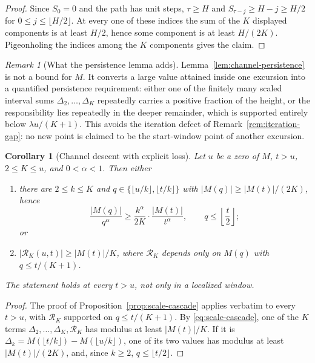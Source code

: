 \documentclass[11pt]{amsart}
\numberwithin{equation}{section}
\theoremstyle{plain}
\newtheorem{corollary}[theorem]{Corollary}
\theoremstyle{definition}
\theoremstyle{remark}
\newtheorem{remark}[theorem]{Remark}
\begin{document}
\begin{proof}
Since $S_0=0$ and the path has unit steps, $\tau\ge H$ and
$S_{\tau-j}\ge H-j\ge H/2$ for
$0\le j\le\lfloor H/2\rfloor$.  At every one of these indices the sum of
the $K$ displayed components is at least $H/2$, hence some component is at
least $H/(2K)$.  Pigeonholing the indices among the $K$ components gives the
claim.
\end{proof}

\begin{remark}[What the persistence lemma adds]
\label{rem:persistence-content}
Lemma~\ref{lem:channel-persistence} is not a bound for $M$.  It converts a
large value attained inside one excursion into a quantified persistence
requirement: either one of the finitely many scaled interval sums
$\Delta_2,\ldots,\Delta_K$ repeatedly carries a positive fraction of the
height, or the responsibility lies repeatedly in the deeper remainder,
which is supported entirely below $\lambda u/(K+1)$.  This avoids the
iteration defect of Remark~\ref{rem:iteration-gap}: no new point is claimed
to be the start-window point of another excursion.
\end{remark}
\begin{corollary}[Channel descent with explicit loss]
\label{cor:channel-descent}
Let $u$ be a zero of $M$, $t>u$, $2\le K\le u$, and $0<\alpha<1$. Then either
\begin{enumerate}[label=\textup{(\roman*)}]
\item there are $2\le k\le K$ and $q\in\{\lfloor u/k\rfloor,\lfloor t/k\rfloor\}$
with $|M(q)|\ge|M(t)|/(2K)$, hence
\[
\frac{|M(q)|}{q^\alpha}\ge\frac{k^\alpha}{2K}\cdot\frac{|M(t)|}{t^\alpha},
\qquad q\le\left\lfloor\frac t2\right\rfloor;
\]
or
\item $|\mathcal R_K(u,t)|\ge|M(t)|/K$, where $\mathcal R_K$ depends only on
$M(q)$ with $q\le t/(K+1)$.
\end{enumerate}
The statement holds at every $t>u$, not only in a localized window.
\end{corollary}

\begin{proof}
The proof of Proposition~\ref{prop:scale-cascade} applies verbatim to every
$t>u$, with $\mathcal R_K$ supported on $q\le t/(K+1)$. By \eqref{eq:scale-cascade}, one of the $K$ terms
$\Delta_2,\dots,\Delta_K,\mathcal R_K$ has modulus at least $|M(t)|/K$. If it is
$\Delta_k=M(\lfloor t/k\rfloor)-M(\lfloor u/k\rfloor)$, one of its two values
has modulus at least $|M(t)|/(2K)$, and, since $k\ge2$, $q\le\lfloor t/2\rfloor$.
\end{proof}
\end{document}
